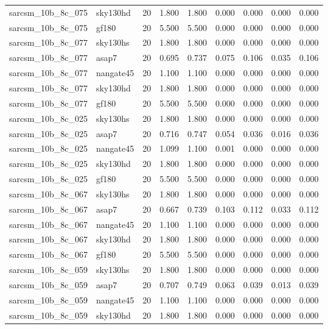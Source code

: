 \begin{tabular}{llrrrrrrr}
sarcsm\_10b\_8c\_075 & sky130hd & 20 & 1.800 & 1.800 & 0.000 & 0.000 & 0.000 & 0.000 \\
sarcsm\_10b\_8c\_075 & gf180 & 20 & 5.500 & 5.500 & 0.000 & 0.000 & 0.000 & 0.000 \\
sarcsm\_10b\_8c\_077 & sky130hs & 20 & 1.800 & 1.800 & 0.000 & 0.000 & 0.000 & 0.000 \\
sarcsm\_10b\_8c\_077 & asap7 & 20 & 0.695 & 0.737 & 0.075 & 0.106 & 0.035 & 0.106 \\
sarcsm\_10b\_8c\_077 & nangate45 & 20 & 1.100 & 1.100 & 0.000 & 0.000 & 0.000 & 0.000 \\
sarcsm\_10b\_8c\_077 & sky130hd & 20 & 1.800 & 1.800 & 0.000 & 0.000 & 0.000 & 0.000 \\
sarcsm\_10b\_8c\_077 & gf180 & 20 & 5.500 & 5.500 & 0.000 & 0.000 & 0.000 & 0.000 \\
sarcsm\_10b\_8c\_025 & sky130hs & 20 & 1.800 & 1.800 & 0.000 & 0.000 & 0.000 & 0.000 \\
sarcsm\_10b\_8c\_025 & asap7 & 20 & 0.716 & 0.747 & 0.054 & 0.036 & 0.016 & 0.036 \\
sarcsm\_10b\_8c\_025 & nangate45 & 20 & 1.099 & 1.100 & 0.001 & 0.000 & 0.000 & 0.000 \\
sarcsm\_10b\_8c\_025 & sky130hd & 20 & 1.800 & 1.800 & 0.000 & 0.000 & 0.000 & 0.000 \\
sarcsm\_10b\_8c\_025 & gf180 & 20 & 5.500 & 5.500 & 0.000 & 0.000 & 0.000 & 0.000 \\
sarcsm\_10b\_8c\_067 & sky130hs & 20 & 1.800 & 1.800 & 0.000 & 0.000 & 0.000 & 0.000 \\
sarcsm\_10b\_8c\_067 & asap7 & 20 & 0.667 & 0.739 & 0.103 & 0.112 & 0.033 & 0.112 \\
sarcsm\_10b\_8c\_067 & nangate45 & 20 & 1.100 & 1.100 & 0.000 & 0.000 & 0.000 & 0.000 \\
sarcsm\_10b\_8c\_067 & sky130hd & 20 & 1.800 & 1.800 & 0.000 & 0.000 & 0.000 & 0.000 \\
sarcsm\_10b\_8c\_067 & gf180 & 20 & 5.500 & 5.500 & 0.000 & 0.000 & 0.000 & 0.000 \\
sarcsm\_10b\_8c\_059 & sky130hs & 20 & 1.800 & 1.800 & 0.000 & 0.000 & 0.000 & 0.000 \\
sarcsm\_10b\_8c\_059 & asap7 & 20 & 0.707 & 0.749 & 0.063 & 0.039 & 0.013 & 0.039 \\
sarcsm\_10b\_8c\_059 & nangate45 & 20 & 1.100 & 1.100 & 0.000 & 0.000 & 0.000 & 0.000 \\
sarcsm\_10b\_8c\_059 & sky130hd & 20 & 1.800 & 1.800 & 0.000 & 0.000 & 0.000 & 0.000 \\

\end{tabular}
